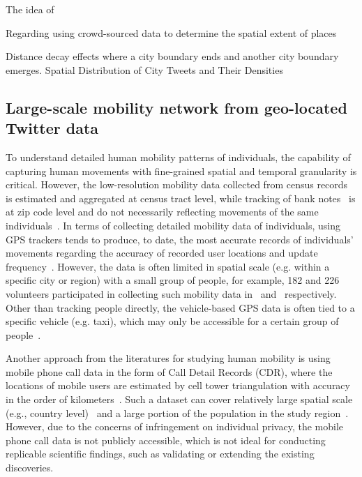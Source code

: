 \documentclass[]{tGIS2e}
\begin{document}
{The idea of 


Regarding using crowd-sourced data to determine the spatial extent of places


Distance decay effects
where a city boundary ends and another city boundary emerges.
Spatial Distribution of City Tweets and Their Densities



\subsection{Large-scale mobility network from geo-located Twitter data}
To understand detailed human mobility patterns of individuals, the capability of capturing human movements with fine-grained spatial and temporal granularity is critical.
However, the low-resolution mobility data collected from census records~\citep{greenwood1985human} is estimated and aggregated at census tract level, while tracking of bank notes~\citep{brockmann2006scaling} is at zip code level and do not necessarily reflecting movements of the same individuals~\citep{gonzalez2008understanding}.
In terms of collecting detailed mobility data of individuals, using GPS trackers tends to produce, to date, the most accurate records of individuals' movements regarding the accuracy of recorded user locations and update frequency~\citep{zheng2008understanding}. However, the data is often limited in spatial scale (e.g. within a specific city or region) with a small group of people, for example, 182 and 226 volunteers participated in collecting such mobility data in~\citep{zheng2010geolife} and~\citep{rhee2011levy} respectively. Other than tracking people directly, the vehicle-based GPS data is often tied to a specific vehicle (e.g. taxi), which may only be accessible for a certain group of people~\citep{kung2014exploring}. 

Another approach from the literatures for studying human mobility is using mobile phone call data in the form of Call Detail Records (CDR), where the locations of mobile users are estimated by cell tower triangulation with accuracy in the order of kilometers~\citep{gonzalez2008understanding,sevtsuk2010does,kung2014exploring}. 
Such a dataset can cover relatively large spatial scale (e.g., country level)~\citep{becker2013human,sobolevsky2013delineating} and a large portion of the population in the study region~\citep{kung2014exploring}. However, due to the concerns of infringement on individual privacy, the mobile phone call data is not publicly accessible, which is not ideal  for conducting replicable scientific findings, such as validating or extending the existing discoveries.

}
\end{document}
